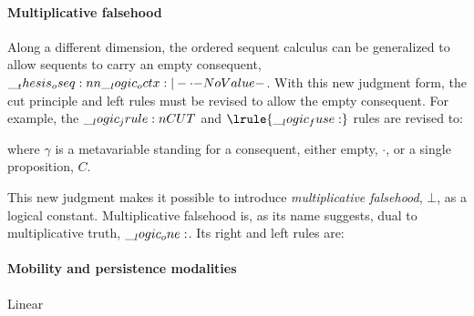 
\paragraph*{Multiplicative falsehood}

Along a different dimension, the ordered sequent calculus can be generalized to allow sequents to carry an empty consequent, $\oseq{\octx |- \cdot}$.
With this new judgment form, the cut principle and left rules must be revised to allow the empty consequent.
For example, the $\__logic_jrule:n {CUT}$ and $\lrule{\fuse}$ rules are revised to:
where $\gamma$ is a metavariable%
standing for a consequent, either empty, $\cdot$, or a single proposition, $C$.

This new judgment makes it possible to introduce \emph{multiplicative falsehood}, $\bot$, as a logical constant.
Multiplicative falsehood is, as its name suggests, dual to multiplicative truth, $\__logic_one:$.
Its right and left rules are:
\begin{inferences}
  \infer[\rrule{\bot}]{\oseq{\octx |- \bot}}{
    \oseq{\octx |- \cdot}}
  \and
  \infer[\lrule{\bot}]{\oseq{\bot |- \cdot}}{}
\end{inferences}

\paragraph*{Mobility and persistence modalities}
Linear




